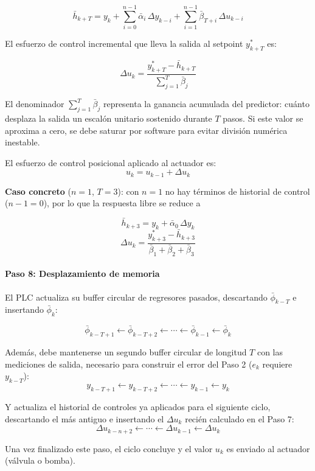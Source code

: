 \[
    \bar{h}_{k+T} = y_k + \sum_{i=0}^{n-1} \bar{\alpha}_i\, \Delta y_{k-i}
    + \sum_{i=1}^{n-1} \bar{\beta}_{T+i}\, \Delta u_{k-i}
\]

El esfuerzo de control incremental que lleva la salida al setpoint $y^*_{k+T}$ es:

\[
    \Delta u_k = \frac{y^*_{k+T} - \bar{h}_{k+T}}{\displaystyle\sum_{j=1}^{T} \bar{\beta}_j}
\]

El denominador $\sum_{j=1}^{T}\bar{\beta}_j$ representa la ganancia acumulada del predictor: cuánto desplaza la salida un escalón unitario sostenido durante $T$ pasos. Si este valor se aproxima a cero, se debe saturar por software para evitar división numérica inestable.

El esfuerzo de control posicional aplicado al actuador es:
\[
    u_k = u_{k-1} + \Delta u_k
\]

\textbf{Caso concreto} ($n=1$, $T=3$): con $n=1$ no hay términos de historial de control ($n-1=0$), por lo que la respuesta libre se reduce a

\[
    \bar{h}_{k+3} = y_k + \bar{\alpha}_0\,\Delta y_k
\]
\[
    \Delta u_k = \frac{y^*_{k+3} - \bar{h}_{k+3}}{\bar{\beta}_1 + \bar{\beta}_2 + \bar{\beta}_3}
\]

\paragraph{Paso 8: Desplazamiento de memoria}

El PLC actualiza su buffer circular de regresores pasados, descartando $\bar{\phi}_{k-T}$ e insertando $\bar{\phi}_k$:

\[
    \bar{\phi}_{k-T+1} \leftarrow \bar{\phi}_{k-T+2} \leftarrow \cdots \leftarrow \bar{\phi}_{k-1} \leftarrow \bar{\phi}_k
\]

Además, debe mantenerse un segundo buffer circular de longitud $T$ con las mediciones de salida, necesario para construir el error del Paso 2 ($e_k$ requiere $y_{k-T}$):
\[
    y_{k-T+1} \leftarrow y_{k-T+2} \leftarrow \cdots \leftarrow y_{k-1} \leftarrow y_k
\]

Y actualiza el historial de controles ya aplicados para el siguiente ciclo, descartando el más antiguo e insertando el $\Delta u_k$ recién calculado en el Paso 7:
\[
    \Delta u_{k-n+2} \leftarrow \cdots \leftarrow \Delta u_{k-1} \leftarrow \Delta u_k
\]

Una vez finalizado este paso, el ciclo concluye y el valor $u_k$ es enviado al actuador (válvula o bomba).
